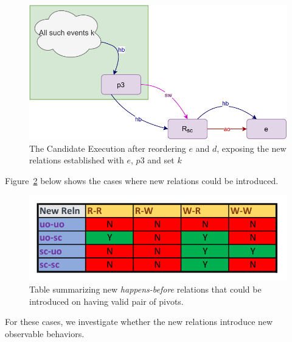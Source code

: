     \begin{figure}[H]
        \centering
        \includegraphics[scale=0.7]{4.InstructionReordering/4.ValidReorderingCandidate/ProofParts/Part2/part2(d).pdf}
        \caption{The Candidate Execution after reordering $e$ and $d$, exposing the new relations established with $e$, $p3$ and set $k$}
        \label{reord:add_reln(b)}
    \end{figure}

    Figure~\ref{reord:add_reln_table} below shows the cases where new relations could be introduced. 
    \begin{figure}[H]
        \centering
        \includegraphics[scale=0.7]{4.InstructionReordering/4.ValidReorderingCandidate/ProofParts/Part2/part2_table.pdf}
        \caption{Table summarizing new \textit{happens-before} relations that could be introduced on having valid pair of pivots.}
        \label{reord:add_reln_table}
    \end{figure}

    For these cases, we investigate whether the new relations introduce new observable behaviors. 
